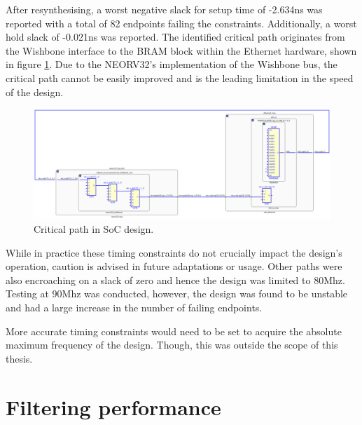 After resynthesising, a worst negative slack for setup time of -2.634ns was reported with a total of 82 endpoints failing the constraints. Additionally, a worst hold slack of -0.021ns was reported. The identified critical path originates from the Wishbone interface to the BRAM block within the Ethernet hardware, shown in figure \ref{fig:crit_path}. Due to the NEORV32's implementation of the Wishbone bus, the critical path cannot be easily improved and is the leading limitation in the speed of the design. 


\begin{figure}[h]
    \centering
    \includegraphics[width=1\textwidth]{Images/critical_path_delay_schematic.png}
    \caption[Critical path in SoC design]{Critical path in SoC design.}
    \label{fig:crit_path}
\end{figure}


While in practice these timing constraints do not crucially impact the design's operation, caution is advised in future adaptations or usage. Other paths were also encroaching on a slack of zero and hence the design was limited to 80Mhz. Testing at 90Mhz was conducted, however, the design was found to be unstable and had a large increase in the number of failing endpoints.

More accurate timing constraints would need to be set to acquire the absolute maximum frequency of the design. Though, this was outside the scope of this thesis. 





















\section{Filtering performance}


